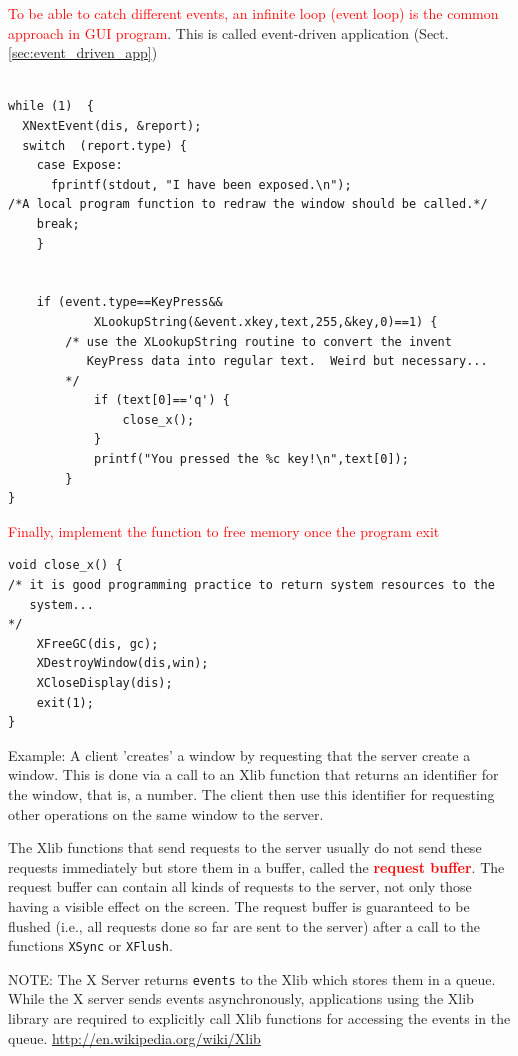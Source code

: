\textcolor{red}{To be able to catch different events, an infinite loop (event
loop) is the common approach in GUI program}. This is called event-driven
application (Sect.\ref{sec:event_driven_app})
\begin{verbatim}

while (1)  {
  XNextEvent(dis, &report);
  switch  (report.type) {
    case Expose:   
      fprintf(stdout, "I have been exposed.\n");
/*A local program function to redraw the window should be called.*/
    break;
    }
  
  
    if (event.type==KeyPress&&
		    XLookupString(&event.xkey,text,255,&key,0)==1) {
		/* use the XLookupString routine to convert the invent
		   KeyPress data into regular text.  Weird but necessary...
		*/
			if (text[0]=='q') {
				close_x();
			}
			printf("You pressed the %c key!\n",text[0]);
		}  
}

\end{verbatim}

\textcolor{red}{Finally, implement the function to free memory once the program
exit}
\begin{verbatim}
void close_x() {
/* it is good programming practice to return system resources to the 
   system...
*/
	XFreeGC(dis, gc);
	XDestroyWindow(dis,win);
	XCloseDisplay(dis);	
	exit(1);				
}
\end{verbatim}


Example: A client 'creates' a window by requesting that the server create
a window. This is done via a call to an Xlib function that returns an identifier for the
window, that is, a number. The client then use this identifier for requesting
other operations on the same window to the server.

The Xlib functions that send requests to the server usually do not send these
requests immediately but store them in a buffer, called the
\textcolor{red}{\bf request buffer}. 
The request buffer can contain all kinds of requests to the server, not only
those having a visible effect on the screen. 
The request buffer is guaranteed to be flushed (i.e., all requests done so far
are sent to the server) after a call to the functions \verb!XSync! or
\verb!XFlush!.

NOTE: The X Server returns \verb!events! to the Xlib which stores them in a
queue. While the X server sends events asynchronously, applications using the
Xlib library are required to explicitly call Xlib functions for accessing the
events in the queue.
\url{http://en.wikipedia.org/wiki/Xlib}

